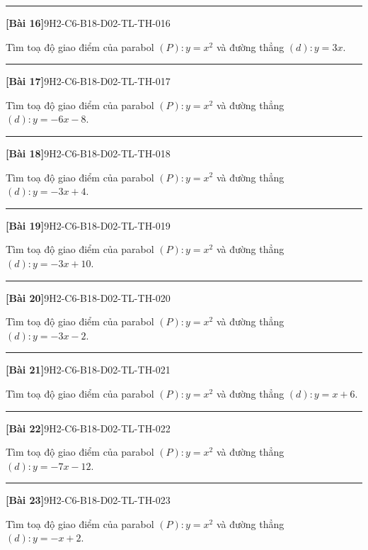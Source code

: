 \documentclass[12pt,a4paper]{article}
\newif\ifloigiai
\newenvironment{cauhoi}[2]{%
  \par\medskip\noindent\rule{\textwidth}{0.4pt}\par\nopagebreak
  \noindent\textbf{[#1]}\hfill{\scriptsize\ttfamily #2}\par\nopagebreak\smallskip}{\par}
\newcommand{\loigiai}[1]{\ifloigiai\par\smallskip\noindent\textit{Lời giải.} #1\par\fi}
\begin{document}
\begin{cauhoi}{Bài 16}{9H2-C6-B18-D02-TL-TH-016}
Tìm toạ độ giao điểm của parabol $(P): y=x^{2}$ và đường thẳng $(d): y=3x$.
\loigiai{Phương trình hoành độ giao điểm: $x^{2}=3x$ hay $x^{2}-3x+0=0$, có hai nghiệm $x=0$ và $x=3$. Giao điểm là $(0;0)$ và $(3;9)$.}
\end{cauhoi}
\begin{cauhoi}{Bài 17}{9H2-C6-B18-D02-TL-TH-017}
Tìm toạ độ giao điểm của parabol $(P): y=x^{2}$ và đường thẳng $(d): y=-6x-8$.
\loigiai{Phương trình hoành độ giao điểm: $x^{2}=-6x-8$ hay $x^{2}+6x+8=0$, có hai nghiệm $x=-4$ và $x=-2$. Giao điểm là $(-4;16)$ và $(-2;4)$.}
\end{cauhoi}
\begin{cauhoi}{Bài 18}{9H2-C6-B18-D02-TL-TH-018}
Tìm toạ độ giao điểm của parabol $(P): y=x^{2}$ và đường thẳng $(d): y=-3x+4$.
\loigiai{Phương trình hoành độ giao điểm: $x^{2}=-3x+4$ hay $x^{2}+3x-4=0$, có hai nghiệm $x=-4$ và $x=1$. Giao điểm là $(-4;16)$ và $(1;1)$.}
\end{cauhoi}
\begin{cauhoi}{Bài 19}{9H2-C6-B18-D02-TL-TH-019}
Tìm toạ độ giao điểm của parabol $(P): y=x^{2}$ và đường thẳng $(d): y=-3x+10$.
\loigiai{Phương trình hoành độ giao điểm: $x^{2}=-3x+10$ hay $x^{2}+3x-10=0$, có hai nghiệm $x=-5$ và $x=2$. Giao điểm là $(-5;25)$ và $(2;4)$.}
\end{cauhoi}
\begin{cauhoi}{Bài 20}{9H2-C6-B18-D02-TL-TH-020}
Tìm toạ độ giao điểm của parabol $(P): y=x^{2}$ và đường thẳng $(d): y=-3x-2$.
\loigiai{Phương trình hoành độ giao điểm: $x^{2}=-3x-2$ hay $x^{2}+3x+2=0$, có hai nghiệm $x=-2$ và $x=-1$. Giao điểm là $(-2;4)$ và $(-1;1)$.}
\end{cauhoi}
\begin{cauhoi}{Bài 21}{9H2-C6-B18-D02-TL-TH-021}
Tìm toạ độ giao điểm của parabol $(P): y=x^{2}$ và đường thẳng $(d): y=x+6$.
\loigiai{Phương trình hoành độ giao điểm: $x^{2}=x+6$ hay $x^{2}-x-6=0$, có hai nghiệm $x=-2$ và $x=3$. Giao điểm là $(-2;4)$ và $(3;9)$.}
\end{cauhoi}
\begin{cauhoi}{Bài 22}{9H2-C6-B18-D02-TL-TH-022}
Tìm toạ độ giao điểm của parabol $(P): y=x^{2}$ và đường thẳng $(d): y=-7x-12$.
\loigiai{Phương trình hoành độ giao điểm: $x^{2}=-7x-12$ hay $x^{2}+7x+12=0$, có hai nghiệm $x=-4$ và $x=-3$. Giao điểm là $(-4;16)$ và $(-3;9)$.}
\end{cauhoi}
\begin{cauhoi}{Bài 23}{9H2-C6-B18-D02-TL-TH-023}
Tìm toạ độ giao điểm của parabol $(P): y=x^{2}$ và đường thẳng $(d): y=-x+2$.
\loigiai{Phương trình hoành độ giao điểm: $x^{2}=-x+2$ hay $x^{2}+x-2=0$, có hai nghiệm $x=-2$ và $x=1$. Giao điểm là $(-2;4)$ và $(1;1)$.}
\end{cauhoi}
\end{document}
